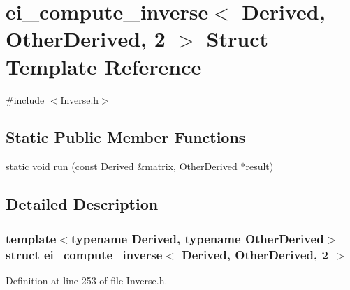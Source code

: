 \hypertarget{structei__compute__inverse_3_01_derived_00_01_other_derived_00_012_01_4}{\section{ei\-\_\-compute\-\_\-inverse$<$ Derived, Other\-Derived, 2 $>$ Struct Template Reference}
\label{structei__compute__inverse_3_01_derived_00_01_other_derived_00_012_01_4}
}


{\ttfamily \#include $<$Inverse.\-h$>$}

\subsection*{Static Public Member Functions}
\begin{DoxyCompactItemize}
\item 
static \hyperlink{group___u_a_v_objects_plugin_ga444cf2ff3f0ecbe028adce838d373f5c}{void} \hyperlink{structei__compute__inverse_3_01_derived_00_01_other_derived_00_012_01_4_a305fb2df88bc7b6d74c41b6cf475ffb7}{run} (const Derived \&\hyperlink{glext_8h_a7b24a3f2f56eb1244ae69dacb4fecb6f}{matrix}, Other\-Derived $\ast$\hyperlink{qxtslotjob_8h_aab161efab0511ea9612b64c40e9852ca}{result})
\end{DoxyCompactItemize}


\subsection{Detailed Description}
\subsubsection*{template$<$typename Derived, typename Other\-Derived$>$struct ei\-\_\-compute\-\_\-inverse$<$ Derived, Other\-Derived, 2 $>$}



Definition at line 253 of file Inverse.\-h.



